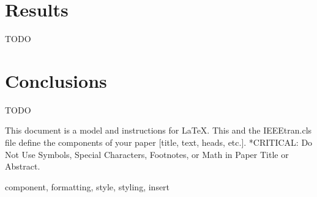\documentclass[conference]{IEEEtran}
\begin{document}
\section{Results}
TODO
\section{Conclusions}
TODO

This document is a model and instructions for \LaTeX.
This and the IEEEtran.cls file define the components of your paper [title, text, heads, etc.]. *CRITICAL: Do Not Use Symbols, Special Characters, Footnotes, 
or Math in Paper Title or Abstract.

\begin{IEEEkeywords}
component, formatting, style, styling, insert
\end{IEEEkeywords}
\end{document}

